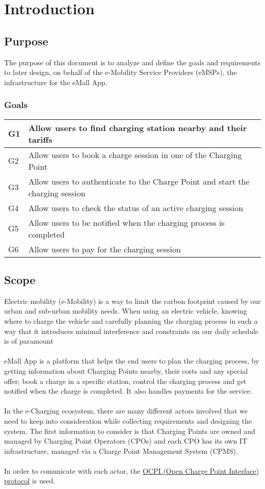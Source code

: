 \chapter{Introduction}
\section{Purpose}
The purpose of this document is to analyze and define the goals and requirements to later design, on behalf of the e-Mobility Service Providers (eMSPs), the infrastructure for the eMall App.

\subsection{Goals}
\begin{tabular}{ |l|l| } 
 \hline
G1 & Allow users to find charging station nearby and their tariffs\\
 \hline
G2 & Allow users to book a charge session in one of the Charging Point\\
 \hline
G3 & Allow users to authenticate to the Charge Point and start the charging session\\
 \hline
G4 & Allow users to check the status of an active charging session\\
 \hline
G5 & Allow users to be notified when the charging process is completed\\
 \hline
G6 & Allow users to pay for the charging session\\
 \hline
\end{tabular}

\section{Scope}
Electric mobility (e-Mobility) is a way to limit the carbon footprint caused by our urban and sub-urban mobility needs. When using an electric vehicle, knowing where to charge the vehicle and carefully planning the charging process in such a way that it introduces minimal interference and constraints on our daily schedule is of paramount \\\\
eMall App is a platform that helps the end users to plan the charging process, by getting information about Charging Points nearby, their costs and any special offer; book a charge in a specific station, control the charging process and get notified when the charge is completed. It also handles payments for the service.\\\\
In the e-Charging ecosystem, there are many different actors involved that we need to keep into consideration while collecting requirements and designing the system. The first information to consider is that Charging Points are owned and managed by Charging Point Operators (CPOs) and each CPO has its own IT infrastructure, managed via a Charge Point Management System (CPMS). \\\\
In order to comunicate with each actor, the 
\href{../Specs/OCPI-2.2.1.pdf}{OCPI (Open Charge Point Interface) protocol} is used.

